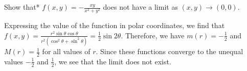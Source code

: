 \documentclass{watsonbook}
\begin{document}
\begin{example}{}{}
  Show that* $f(x,y) = -\frac{xy}{x^2 + y^2}$ does not have a limit as
  $(x,y) \to (0,0)$. 
\end{example}

\begin{solution}
  Expressing the value of the function in polar coordinates, we find
  that
  $f(x,y) =\frac{ r^2 \sin \theta \cos \theta}{r^2(\cos^2 \theta + \sin^2
    \theta)} = \tfrac{1}{2} \sin 2\theta$. Therefore, we have $m(r) =
  -\tfrac{1}{2}$ and $M(r) = \tfrac{1}{2}$ for all values of $r$. Since
  these functions converge to the unequal values $-\tfrac{1}{2}$ and
  $\tfrac{1}{2}$, we see that the limit does not exist. 
\end{solution}
\end{document}
